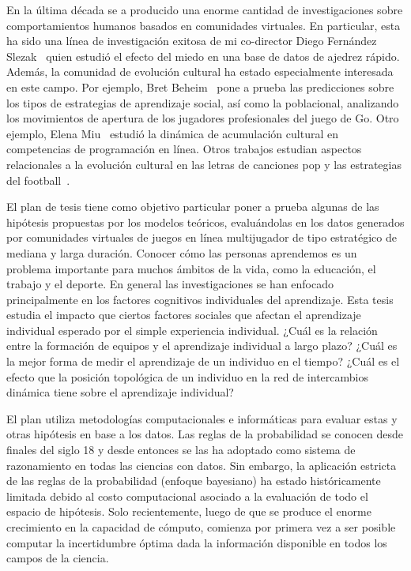 \documentclass[a4paper,11pt]{book}
\theoremstyle{definition}
\begin{document}
En la última década se a producido una enorme cantidad de investigaciones sobre comportamientos humanos basados en comunidades virtuales.
%
En particular, esta ha sido una línea de investigación exitosa de mi co-director Diego Fernández Slezak~\cite{slezak2012-doNotFearYourOpponent} quien estudió el efecto del miedo en una base de datos de ajedrez rápido.
%
Además, la comunidad de evolución cultural ha estado especialmente interesada en este campo.
%
Por ejemplo, Bret Beheim~\cite{Beheim2014} pone a prueba las predicciones sobre los tipos de estrategias de aprendizaje social, así como la poblacional, analizando los movimientos de apertura de los jugadores profesionales del juego de Go.
%
Otro ejemplo, Elena Miu~\cite{miu2018-cumulativeCultureOnlineProgrammingContests} estudió la dinámica de acumulación cultural en competencias de programación en línea.
%
Otros trabajos estudian aspectos relacionales a la evolución cultural en las letras de canciones pop \cite{brand2019-songLyrics} y las estrategias del football~\cite{mesoudi2020-footballTactics}.


El plan de tesis tiene como objetivo particular poner a prueba algunas de las hipótesis propuestas por los modelos teóricos, evaluándolas en los datos generados por comunidades virtuales de juegos en línea multijugador de tipo estratégico de mediana y larga duración.
%
Conocer cómo las personas aprendemos es un problema importante para muchos ámbitos de la vida, como la educación, el trabajo y el deporte.
%
En general las investigaciones se han enfocado principalmente en los factores cognitivos individuales del aprendizaje.
%
Esta tesis estudia el impacto que ciertos factores sociales que afectan el aprendizaje individual esperado por el simple experiencia individual.
%
¿Cuál es la relación entre la formación de equipos y el aprendizaje individual a largo plazo?
%
¿Cuál es la mejor forma de medir el aprendizaje de un individuo en el tiempo?
%
¿Cuál es el efecto que la posición topológica de un individuo en la red de intercambios dinámica tiene sobre el aprendizaje individual?


El plan utiliza metodologías computacionales e informáticas para evaluar estas y otras hipótesis en base a los datos.
%
Las reglas de la probabilidad se conocen desde finales del siglo 18 y desde entonces se las ha adoptado como sistema de razonamiento en todas las ciencias con datos.
%
Sin embargo, la aplicación estricta de las reglas de la probabilidad (enfoque bayesiano) ha estado históricamente limitada debido al costo computacional asociado a la evaluación de todo el espacio de hipótesis.
%
Solo recientemente, luego de que se produce el enorme crecimiento en la capacidad de cómputo, comienza por primera vez a ser posible computar la incertidumbre óptima dada la información disponible en todos los campos de la ciencia.
\end{document}
